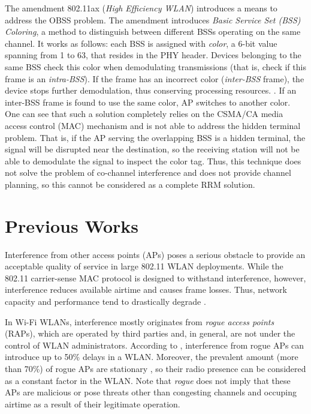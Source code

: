 The amendment 802.11ax \cite{ieee80211ax} (\textit{High Efficiency WLAN}) introduces a means to address the OBSS problem. The amendment introduces \textit{Basic Service Set (BSS) Coloring}, a method to distinguish between different BSSs operating on the same channel. It works as follows: each BSS is assigned with \textit{color}, a 6-bit value spanning from 1 to 63, that resides in the PHY header. Devices belonging to the same BSS check this color when demodulating transmissions (that is, check if this frame is an \textit{intra-BSS}). If the frame has an incorrect color (\textit{inter-BSS} frame), the device stops further demodulation, thus conserving processing resources. \cite{CiscoCatalyst9800}.
If an inter-BSS frame is found to use the same color, AP switches to another color.
One can see that such a solution completely relies on the CSMA/CA media access control (MAC) mechanism and is not able to address the hidden terminal problem. That is, if the AP serving the overlapping BSS is a hidden terminal, the signal will be disrupted near the destination, so the receiving station will not be able to demodulate the signal to inspect the color tag.
Thus, this technique does not solve the problem of co-channel interference and does not provide channel planning, so this cannot be considered as a complete RRM solution.



\section {Previous Works}
\label{chap:lr:sec:prev_works}
Interference from other access points (APs) poses a serious obstacle \cite{suiHowBadAre2015} to provide an acceptable quality of service in large 802.11 WLAN deployments. While the 802.11 carrier-sense MAC protocol is designed to withstand interference, however, interference reduces available airtime and causes frame losses. Thus, network capacity and performance tend to drastically degrade \cite{levantiCAPWAPCompliantSolutionRadio2007}.%

In Wi-Fi WLANs, interference mostly originates from \textit{rogue access points} (RAPs), which are operated by third parties and, in general, are not under the control of WLAN administrators. According to \cite{suiHowBadAre2015}, interference from rogue APs can introduce up to 50\% delays in a WLAN. Moreover, the prevalent amount (more than 70\%) of rogue APs are stationary \cite{suiHowBadAre2015}, so their radio presence can be considered as a constant factor in the WLAN. Note that \textit{rogue} does not imply that these APs are malicious or pose threats other than congesting channels and occuping airtime as a result of their legitimate operation.

